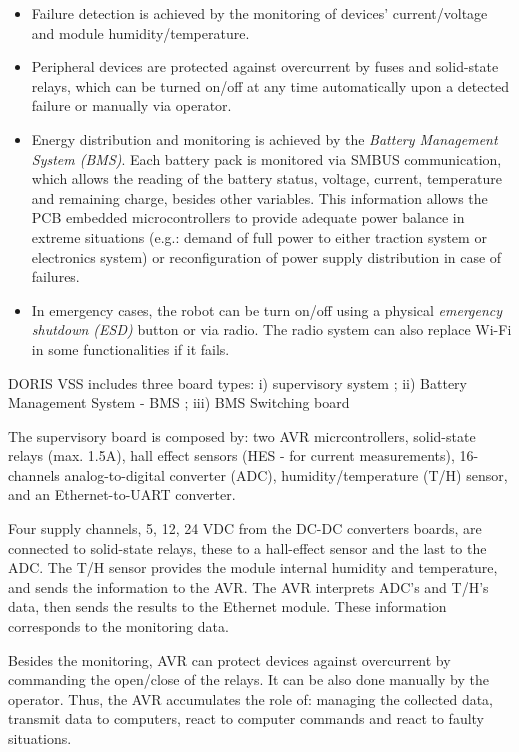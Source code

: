 \documentclass{ifacconf}
\begin{document}
\begin{itemize}
    \item Failure detection is achieved by the monitoring of devices'
    current/voltage and module humidity/temperature.
    \item Peripheral devices are protected against overcurrent by fuses and
    solid-state relays, which can be turned on/off at any time automatically
    upon a detected failure or manually via operator.
    \item Energy distribution and monitoring is achieved by the \emph{Battery
    Management System (BMS)}. Each battery pack is monitored via SMBUS
    communication, which allows the reading of the battery status, voltage,
    current, temperature and remaining charge, besides other variables. This
    information allows the PCB embedded microcontrollers to provide adequate
    power balance in extreme situations (e.g.: demand of full power to either
    traction system or electronics system) or reconfiguration of power supply
    distribution in case of failures. 
    \item In emergency cases, the robot can be turn on/off using a physical
    \emph{emergency shutdown (ESD)} button or via radio. The radio system can
    also replace Wi-Fi in some functionalities if it fails.
  \end{itemize}
  
DORIS VSS includes three board types: i) supervisory system
; ii) Battery Management System - BMS
; iii) BMS Switching board%

The supervisory board is composed by: two AVR micrcontrollers, solid-state
relays (max. 1.5A), hall effect sensors (HES - for current measurements),
16-channels analog-to-digital converter (ADC), humidity/temperature (T/H)
sensor, and an Ethernet-to-UART converter. 

Four supply channels, 5, 12, 24 VDC from the DC-DC converters boards, are
connected to solid-state relays, these to a hall-effect sensor and the last to
the ADC. The T/H sensor provides the module internal humidity and temperature,
and sends the information to the AVR. The AVR interprets ADC's and T/H's data,
then sends the results to the Ethernet module. These information corresponds to
the monitoring data. 

Besides the monitoring, AVR can protect devices against overcurrent by
commanding the open/close of the relays. It can be also done manually by the
operator. Thus, the AVR accumulates the role of: managing the collected
data, transmit data to computers, react to computer commands and react to
faulty situations.
 
\end{document}
